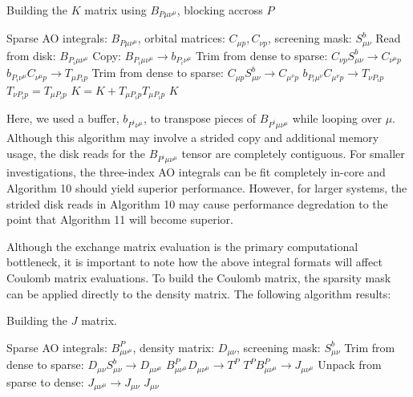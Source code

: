 \begin{algorithm}[H]
\caption{Building the $K$ matrix using $B_{P \mu \nu^\mu}$, blocking accross $P$}
\begin{algorithmic}
\REQUIRE Sparse AO integrals: $B_{P \mu \nu^\mu}$, orbital matrices: $C_{\mu p}, C_{\nu p}$, screening mask: $S_{\mu \nu}^b$
    \STATE Read from disk: $B_{P_i \mu \nu^{\mu}}$
        \STATE Copy: $B_{P_i \mu \nu^{\mu}} \rightarrow b_{P_i \nu^{\mu}}$
        \STATE Trim from dense to sparse: $C_{\nu p}S_{\mu \nu}^b \rightarrow C_{\nu^{\mu} p}$
        \STATE $b_{P_i \nu^{\mu}} C_{\nu^{\mu} p} \rightarrow T_{\mu P_i p}$
            \STATE Trim from dense to sparse: $C_{\mu p}S_{\mu \nu}^b \rightarrow C_{\mu^{\nu} p}$
            \STATE $b_{P_i \mu^{\nu}} C_{\mu^{\nu} p} \rightarrow T_{\nu P_i p}$
        \ELSE
            \STATE $T_{\nu P_i p} = T_{\mu P_i p}$ 
        \ENDIF
    \ENDFOR
    \STATE $K = K +  T_{\mu P_i p} T_{\mu P_i p} $
\ENDFOR
\RETURN $K$
\end{algorithmic}
\end{algorithm}

\noindent Here, we used a buffer, $b_{P^i \nu^{\mu}}$, to transpose pieces of $B_{P^i \mu \nu^{\mu}}$ while looping over $\mu$.
Although this algorithm may involve a strided copy and additional memory usage, the disk reads for the $B_{P^i \mu \nu^{\mu}}$ 
tensor are completely contiguous. 
For smaller investigations, the three-index AO integrals can be fit completely in-core and Algorithm 10 should yield superior 
performance. However, for larger systems,
the strided disk reads in Algorithm 10 may cause performance degredation to the point that Algorithm 11 will become superior.

Although the exchange matrix evaluation is the primary computational bottleneck, it is important to note how the above integral
formats will affect Coulomb matrix evaluations. To build the Coulomb matrix, the sparsity mask can be applied
directly to the density matrix. The following algorithm results:

\begin{algorithm}[H]
\caption{Building the $J$ matrix.}
\begin{algorithmic}
\REQUIRE Sparse AO integrals: $B_{\mu \nu^{\mu}}^P$, density matrix: $D_{\mu \nu}$, screening mask: $S_{\mu \nu}^b$
\STATE Trim from dense to sparse: $D_{\mu \nu}S_{\mu \nu}^b \rightarrow D_{\mu \nu^{\mu} }$
\STATE $B^P_{\mu\nu^{\mu}} D_{\mu \nu^{\mu}} \rightarrow T^{P}$
\STATE $T^{P} B^P_{\mu \nu^{\mu}} \rightarrow J_{\mu \nu^{\mu}} $
\STATE Unpack from sparse to dense: $J_{\mu \nu^{\mu}} \rightarrow J_{\mu \nu}$
\RETURN $J_{\mu \nu}$
\end{algorithmic}
\end{algorithm}

